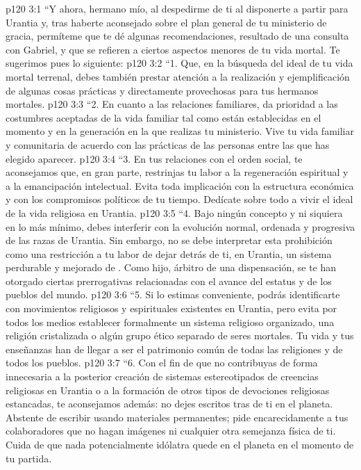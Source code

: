 \vs p120 3:1 “Y ahora, hermano mío, al despedirme de ti al disponerte a partir para Urantia y, tras haberte aconsejado sobre el plan general de tu ministerio de gracia, permíteme que te dé algunas recomendaciones, resultado de una consulta con Gabriel, y que se refieren a ciertos aspectos menores de tu vida mortal. Te sugerimos pues lo siguiente:
\vs p120 3:2 “1. Que, en la búsqueda del ideal de tu vida mortal terrenal, debes también prestar atención a la realización y ejemplificación de algunas cosas prácticas y directamente provechosas para tus hermanos mortales.
\vs p120 3:3 \pc “2. En cuanto a las relaciones familiares, da prioridad a las costumbres aceptadas de la vida familiar tal como están establecidas en el momento y en la generación en la que realizas tu ministerio. Vive tu vida familiar y comunitaria de acuerdo con las prácticas de las personas entre las que has elegido aparecer.
\vs p120 3:4 \pc “3. En tus relaciones con el orden social, te aconsejamos que, en gran parte, restrinjas tu labor a la regeneración espiritual y a la emancipación intelectual. Evita toda implicación con la estructura económica y con los compromisos políticos de tu tiempo. Dedícate sobre todo a vivir el ideal de la vida religiosa en Urantia.
\vs p120 3:5 \pc “4. Bajo ningún concepto y ni siquiera en lo más mínimo, debes interferir con la evolución normal, ordenada y progresiva de las razas de Urantia. Sin embargo, no se debe interpretar esta prohibición como una restricción a tu labor de dejar detrás de ti, en Urantia, un sistema perdurable y mejorado de . Como hijo, árbitro de una dispensación, se te han otorgado ciertas prerrogativas relacionadas con el avance del estatus  y  de los pueblos del mundo.
\vs p120 3:6 \pc “5. Si lo estimas conveniente, podrás identificarte con movimientos religiosos y espirituales existentes en Urantia, pero evita por todos los medios establecer formalmente un sistema religioso organizado, una religión cristalizada o algún grupo ético separado de seres mortales. Tu vida y tus enseñanzas han de llegar a ser el patrimonio común de todas las religiones y de todos los pueblos.
\vs p120 3:7 \pc “6. Con el fin de que no contribuyas de forma innecesaria a la posterior creación de sistemas estereotipados de creencias religiosas en Urantia o a la formación de otros tipos de devociones religiosas estancadas, te aconsejamos además: no dejes escritos tras de ti en el planeta. Abstente de escribir usando materiales permanentes; pide encarecidamente a tus colaboradores que no hagan imágenes ni cualquier otra semejanza física de ti. Cuida de que nada potencialmente idólatra quede en el planeta en el momento de tu partida.
